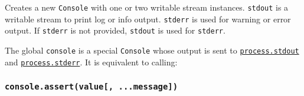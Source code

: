 Creates a new \texttt{Console} with one or two writable stream
instances. \texttt{stdout} is a writable stream to print log or info
output. \texttt{stderr} is used for warning or error output. If
\texttt{stderr} is not provided, \texttt{stdout} is used for
\texttt{stderr}.

\begin{Shaded}
\begin{Highlighting}[]
\OperatorTok{=}\NormalTok{(}\NormalTok{)}\OperatorTok{;}
\OperatorTok{=}\NormalTok{(}\NormalTok{)}\OperatorTok{;}
\OperatorTok{=}  \NormalTok{(\{ }\OperatorTok{:}\OperatorTok{,} \OperatorTok{:}\OperatorTok{;}
\OperatorTok{=} \OperatorTok{;}
\NormalTok{(}\OperatorTok{,}\OperatorTok{;}
\end{Highlighting}
\end{Shaded}

The global \texttt{console} is a special \texttt{Console} whose output
is sent to \href{process.md\#processstdout}{\texttt{process.stdout}} and
\href{process.md\#processstderr}{\texttt{process.stderr}}. It is
equivalent to calling:

\begin{Shaded}
\begin{Highlighting}[]
 \NormalTok{(\{ }\OperatorTok{:} \OperatorTok{,} \OperatorTok{:} \NormalTok{ \})}\OperatorTok{;}
\end{Highlighting}
\end{Shaded}

\subsubsection{\texorpdfstring{\texttt{console.assert(value{[},\ ...message{]})}}{console.assert(value{[}, ...message{]})}}\label{console.assertvalue-...message}


